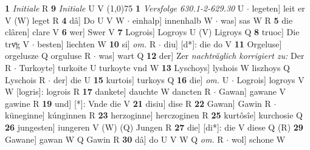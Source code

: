 \documentclass[8pt,a4paper,notitlepage]{article}
\begin{document}
\begin{table}[ht]
\begin{minipage}[t]{0.5\linewidth}
\textbf{1} \textit{Initiale} R  \textbf{9} \textit{Initiale} U V  \newline
\line(1,0){75} \newline
\textbf{1} \textit{Versfolge 630.1-2-629.30} U   $\cdot$ legeten] leit er V (W) leget R \textbf{4} dâ] Do U V W  $\cdot$ einhalp] innenhalb W  $\cdot$ was] sas W R \textbf{5} die clâren] clare V \textbf{6} wer] Swer V \textbf{7} Logrois] Logroys U (V) Ligroys Q \textbf{8} truoc] Die trvͦg V  $\cdot$ besten] liechten W \textbf{10} si] \textit{om.} R  $\cdot$ diu] [d*]: die do V \textbf{11} Orgeluse] orgelusze Q orguluse R  $\cdot$ was] wart Q \textbf{12} der] Zer \textit{nachträglich korrigiert zu:} Der R  $\cdot$ Turkoyte] turkoite U turkoyte vnd W \textbf{13} Lyschoys] lyshois W liszhoys Q Lyschois R  $\cdot$ der] die U \textbf{15} kurtois] turkoys Q \textbf{16} die] \textit{om.} U  $\cdot$ Logrois] logroys V W [logris]: logrois R \textbf{17} dankete] dauchte W dancten R  $\cdot$ Gawan] gawane V gawine R \textbf{19} und] [*]: Vnde die V \textbf{21} disiu] dise R \textbf{22} Gawan] Gawin R  $\cdot$ küneginne] kúnginnen R \textbf{23} herzoginne] herczoginen R \textbf{25} kurtôsîe] kurchosie Q \textbf{26} jungesten] iungeren V (W) (Q) Jungen R \textbf{27} die] [di*]: die V diese Q (R) \textbf{29} Gawane] gawan W Q Gawin R \textbf{30} dâ] do U V W Q \textit{om.} R  $\cdot$ wol] schone W \newline
\end{minipage}
\end{table}
\end{document}
